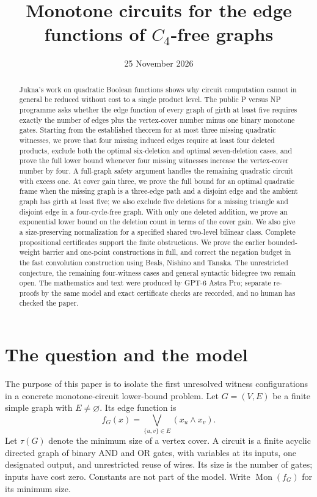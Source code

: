 \documentclass[11pt]{article}
\title{Monotone circuits for the edge functions of $C_4$-free graphs}
\author{}
\date{25 November 2026}
\DeclareMathOperator{\Mon}{Mon}
\theoremstyle{definition}
\begin{document}
\maketitle
\begin{abstract}
Jukna's work on quadratic Boolean functions shows why circuit computation cannot in general be reduced without cost to a single product level. The public P versus NP programme asks whether the edge function of every graph of girth at least five requires exactly the number of edges plus the vertex-cover number minus one binary monotone gates. Starting from the established theorem for at most three missing quadratic witnesses, we prove that four missing induced edges require at least four deleted products, exclude both the optimal six-deletion and optimal seven-deletion cases, and prove the full lower bound whenever four missing witnesses increase the vertex-cover number by four. A full-graph safety argument handles the remaining quadratic circuit with excess one. At cover gain three, we prove the full bound for an optimal quadratic frame when the missing graph is a three-edge path and a disjoint edge and the ambient graph has girth at least five; we also exclude five deletions for a missing triangle and disjoint edge in a four-cycle-free graph. With only one deleted addition, we prove an exponential lower bound on the deletion count in terms of the cover gain. We also give a size-preserving normalization for a specified shared two-level bilinear class. Complete propositional certificates support the finite obstructions. We prove the earlier bounded-weight barrier and one-point constructions in full, and correct the negation budget in the fast convolution construction using Beals, Nishino and Tanaka. The unrestricted conjecture, the remaining four-witness cases and general syntactic bidegree two remain open. The mathematics and text were produced by GPT-6 Astra Pro; separate re-proofs by the same model and exact certificate checks are recorded, and no human has checked the paper.
\end{abstract}

\section{The question and the model}
The purpose of this paper is to isolate the first unresolved witness configurations in a concrete monotone-circuit lower-bound problem.
Let $G=(V,E)$ be a finite simple graph with $E\ne\varnothing$. Its edge function is
\[
 f_G(x)=\bigvee_{\{u,v\}\in E}(x_u\wedge x_v).
\]
Let $\tau(G)$ denote the minimum size of a vertex cover. A circuit is a finite acyclic directed graph of binary AND and OR gates, with variables at its inputs, one designated output, and unrestricted reuse of wires. Its size is the number of gates; inputs have cost zero. Constants are not part of the model. Write $\Mon(f_G)$ for its minimum size.
\end{document}
